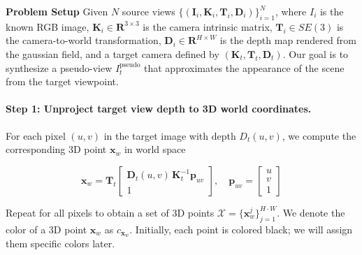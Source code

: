 \noindent\textbf{Problem Setup} \quad Given $N$ source views $\{( \mathbf{I}_i, \mathbf{K}_i, \mathbf{T}_i,  \mathbf{D}_i)\}_{i=1}^N$, where $I_i$ is the known RGB image, $\mathbf{K}_i \in \mathbf{R}^{3 \times 3}$ is the camera intrinsic matrix, $\mathbf{T}_i \in SE(3)$ is the camera-to-world transformation, $\mathbf{D}_i \in \mathbf{R}^{H \times W}$ is the depth map rendered from the gaussian field, and a target camera defined by $(\mathbf{K}_t, \mathbf{T}_t, \mathbf{D}_t)$. Our goal is to synthesize a pseudo-view $I_t^{\text{pseudo}}$ that approximates the appearance of the scene from the target viewpoint.
 

\paragraph{Step 1: Unproject target view depth to 3D world coordinates.}

For each pixel $(u, v)$ in the target image with depth $D_t(u, v)$, we compute the corresponding 3D point $\mathbf{x}_w$ in world space

\vspace{-0.25in}
\begin{equation}
\mathbf{x}_w = \mathbf{T}_t \begin{bmatrix} \mathbf{D}_t(u, v)\, \mathbf{K}_t^{-1} \mathbf{p}_{uv} \\ 1 \end{bmatrix}, \quad \mathbf{p}_{uv} = \begin{bmatrix} u \\ v \\ 1 \end{bmatrix}
\end{equation}


Repeat for all pixels to obtain a set of 3D points $\mathcal{X} = \{\mathbf{x}_w^j\}_{j=1}^{H \cdot W}$. We denote the color of a 3D point $\mathbf{x}_w$ as $c_{\mathbf{x}_w}$. Initially, each point is colored black; we will assign them specific colors later. 

